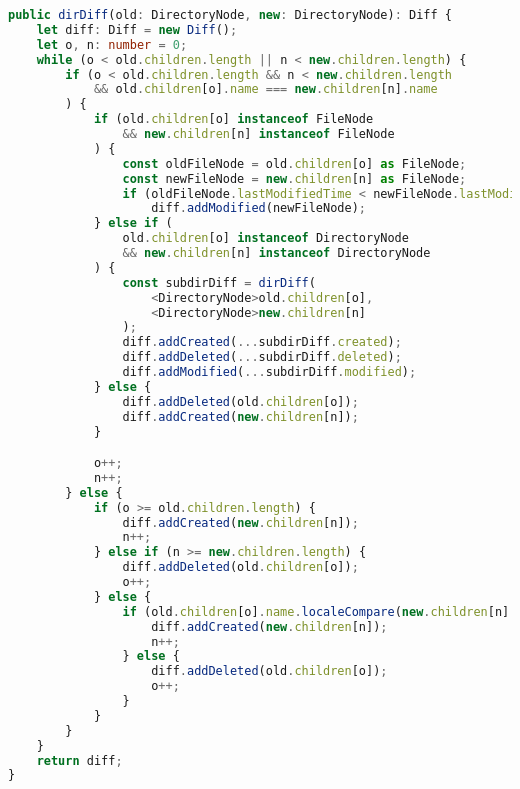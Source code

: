 \begin{lstlisting}[language=TypeScript,caption={Algoritmo recursivo para la comparación de dos árboles de directorios dados dos nodos raíces \texttt{old} y \texttt{new}.},label=cod:comparacionDirNodes]
public dirDiff(old: DirectoryNode, new: DirectoryNode): Diff {
    let diff: Diff = new Diff();
    let o, n: number = 0;
    while (o < old.children.length || n < new.children.length) {
        if (o < old.children.length && n < new.children.length
            && old.children[o].name === new.children[n].name
        ) {
            if (old.children[o] instanceof FileNode
                && new.children[n] instanceof FileNode
            ) {
                const oldFileNode = old.children[o] as FileNode;
                const newFileNode = new.children[n] as FileNode;
                if (oldFileNode.lastModifiedTime < newFileNode.lastModifiedTime)
                    diff.addModified(newFileNode);
            } else if (
                old.children[o] instanceof DirectoryNode 
                && new.children[n] instanceof DirectoryNode
            ) {
                const subdirDiff = dirDiff(
                    <DirectoryNode>old.children[o],
                    <DirectoryNode>new.children[n]
                );
                diff.addCreated(...subdirDiff.created);
                diff.addDeleted(...subdirDiff.deleted);
                diff.addModified(...subdirDiff.modified);
            } else {
                diff.addDeleted(old.children[o]);
                diff.addCreated(new.children[n]);
            }

            o++;
            n++;
        } else {
            if (o >= old.children.length) {
                diff.addCreated(new.children[n]);
                n++;
            } else if (n >= new.children.length) {
                diff.addDeleted(old.children[o]);
                o++;
            } else {
                if (old.children[o].name.localeCompare(new.children[n].name)) {
                    diff.addCreated(new.children[n]);
                    n++;
                } else {
                    diff.addDeleted(old.children[o]);
                    o++;
                }
            }
        }
    }
    return diff;
}
\end{lstlisting}

